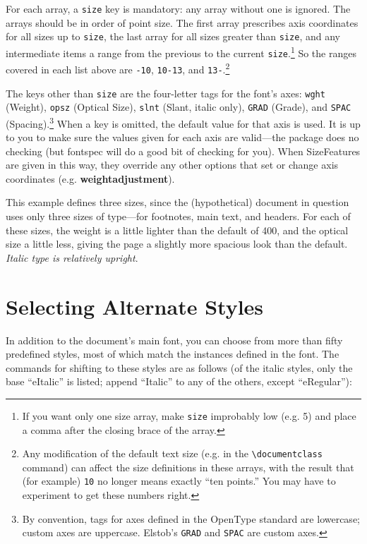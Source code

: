 \documentclass[12pt]{article}
\newcommand{\fspec}{{\sffamily fontspec}}
\newcommand{\src}[1]{{\color{BrickRed}\texttt{#1}}}
\begin{document}
\noindent For each array, a \src{size} key is mandatory: any array without one
is ignored. The arrays should be in order of point size. The first array
prescribes axis coordinates for all sizes up to \src{size}, the last array for all sizes
greater than \src{size}, and any intermediate items a range from the previous to the
current \src{size}.\footnote{%
If you want only one size array, make \src{size} improbably low (e.g. 5) and place
a comma after the closing brace of the array.%
} So the ranges covered in each list above are \src{-10}, \src{10-13},
and \src{13-}.\footnote{Any modification of the default text size (e.g. in the
\src{\textbackslash documentclass} command) can affect the size definitions in these
arrays, with the result that (for example)
\src{10} no longer means exactly “ten points.” You may have to experiment to get these numbers
right.}

The keys other than \src{size} are the four-letter tags for the font's axes: \src{wght}
(Weight), \src{opsz} (Optical Size), \src{slnt} (Slant, italic only), \src{GRAD} (Grade),
and \src{SPAC} (Spacing).\footnote{%
By convention, tags for axes defined in the OpenType standard are lowercase; custom axes
are uppercase. Elstob’s \src{GRAD} and \src{SPAC} are custom axes.%
} When a key
is omitted, the default value for that axis is used. It is up to you to make sure the values
given for each axis are valid---the package does no checking (but {\fspec} will do a good bit
of checking for you). When SizeFeatures are given in
this way, they override any other options that set or change axis coordinates
(e.g. \textbf{weightadjustment}).

This example defines three sizes, since the (hypothetical) document in question uses
only three sizes of type---for footnotes, main text, and headers. For each of these sizes, the
weight is a little lighter than the default of 400, and the optical size a little less, giving
the page a slightly more spacious look than the default. \textit{Italic type is relatively upright}.

\section{Selecting Alternate Styles}

In addition to the document's main font, you can choose from more than fifty
predefined styles, most of which match the instances defined in the font.
The commands for shifting to these
styles are as follows (of the italic styles, only the base “eItalic” is listed;
append “Italic” to any of the others, except “eRegular”):
\end{document}
